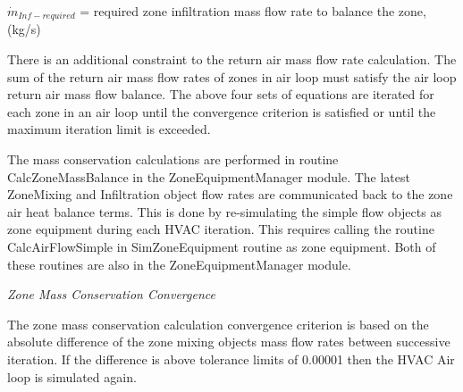 \({\dot m_{Inf-required}}\) = required zone infiltration mass flow rate to balance the zone, (kg/s)

There is an additional constraint to the return air mass flow rate calculation. The sum of the return air mass flow rates of zones in air loop must satisfy the air loop return air mass flow balance. The above four sets of equations are iterated for each zone in an air loop until the convergence criterion is satisfied or until the maximum iteration limit is exceeded.

The mass conservation calculations are performed in routine CalcZoneMassBalance in the ZoneEquipmentManager module. The latest ZoneMixing and Infiltration object flow rates are communicated back to the zone air heat balance terms. This is done by re-simulating the simple flow objects as zone equipment during each HVAC iteration. This requires calling the routine CalcAirFlowSimple in SimZoneEquipment routine as zone equipment. Both of these routines are also in the ZoneEquipmentManager module.

\emph{Zone Mass Conservation Convergence}

The zone mass conservation calculation convergence criterion is based on the absolute difference of the zone mixing objects mass flow rates between successive iteration. If the difference is above tolerance limits of 0.00001 then the HVAC Air loop is simulated again.
